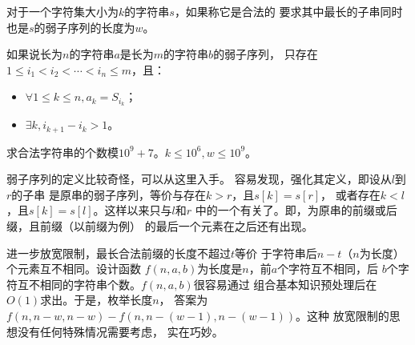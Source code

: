 \begin{prob}
	对于一个字符集大小为$k$的字符串$s$，如果称它是合法的
	要求其中最长的子串同时也是$s$的弱子序列的长度为$w$。
	\par
	如果说长为$n$的字符串$a$是长为$m$的字符串$b$的弱子序列，
	只存在$1 \le i_1 < i_2 < \cdots < i_n \le m$，且：
	\begin{itemize}
		\item $\forall 1 \le k \le n, a_k = S_{i_k}$；
		\item $\exists k, i_{k+1} - i_k > 1$。
	\end{itemize}
	求合法字符串的个数模$10^9+7$。$k \le 10^6, w \le 10^9$。
\end{prob}

\begin{sol}
	弱子序列的定义比较奇怪，可以从这里入手。
	容易发现，强化其定义，即设从$l$到$r$的子串
	是原串的弱子序列，等价与存在$k > r$，且$s[k] = s[r]$，
	或者存在$k < l$，且$s[k] = s[l]$。这样以来只与$l$和$r$
	中的一个有关了。即，为原串的前缀或后缀，且前缀（以前缀为例）
	的最后一个元素在之后还有出现。\par
	进一步放宽限制，最长合法前缀的长度不超过$t$等价
	于字符串后$n-t$（$n$为长度）个元素互不相同。设计函数
	$f(n,a,b)$为长度是$n$，前$a$个字符互不相同，后
	$b$个字符互不相同的字符串个数。$f(n,a,b)$很容易通过
	组合基本知识预处理后在$O(1)$求出。于是，枚举长度$n$，
	答案为$f(n,n-w,n-w)-f(n,n-(w-1),n-(w-1))$。这种
	放宽限制的思想没有任何特殊情况需要考虑，
	实在巧妙。
\end{sol}
